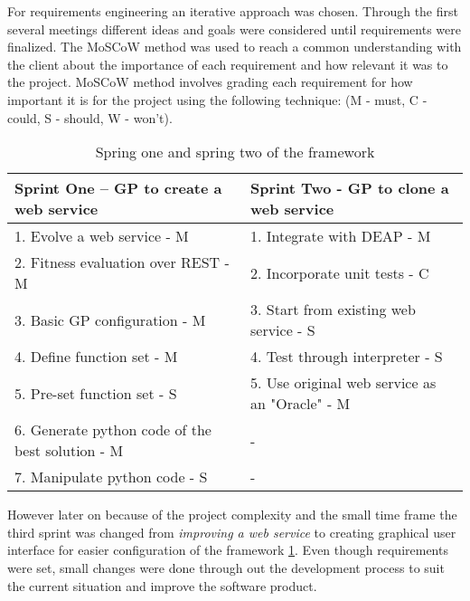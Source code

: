 For requirements engineering an iterative approach was chosen. Through the first several meetings
different ideas and goals were considered until requirements were finalized. The MoSCoW\cite{moscow} method was used to
reach a common understanding with the client about the importance of each requirement and how
relevant it was to the project. MoSCoW method involves grading each requirement for how important it is for the project using the following technique:
(M - must, C - could, S - should, W - won't).

\begin{table}[ht] 
\caption{Spring one and spring two of the framework} %
\centering %
\begin{tabular}{l l} %
\hline\hline %
Sprint One – GP to create a web service & Sprint Two - GP to clone a web service \\ [0.5ex] %
\hline %
1. Evolve a web service - M & 1. Integrate with DEAP - M \\
2. Fitness evaluation over REST - M & 2. Incorporate unit tests - C \\
3. Basic GP configuration - M & 3. Start from existing web service - S \\
4. Define function set - M & 4. Test through interpreter - S \\
5. Pre-set function set - S & 5. Use original web service as an "Oracle" - M \\
6. Generate python code of the best solution - M & - \\
7. Manipulate python code - S & - \\ [1ex]
\hline %
\end{tabular} 
\label{table:req} %
\end{table}

However later on because of the project complexity and the small time frame the third sprint was changed
from \textit{improving a web service} to creating graphical user interface for easier configuration of the 
framework \ref{table:req}. Even though requirements were set, small changes were done through out the development process
to suit the current situation and improve the software product.

